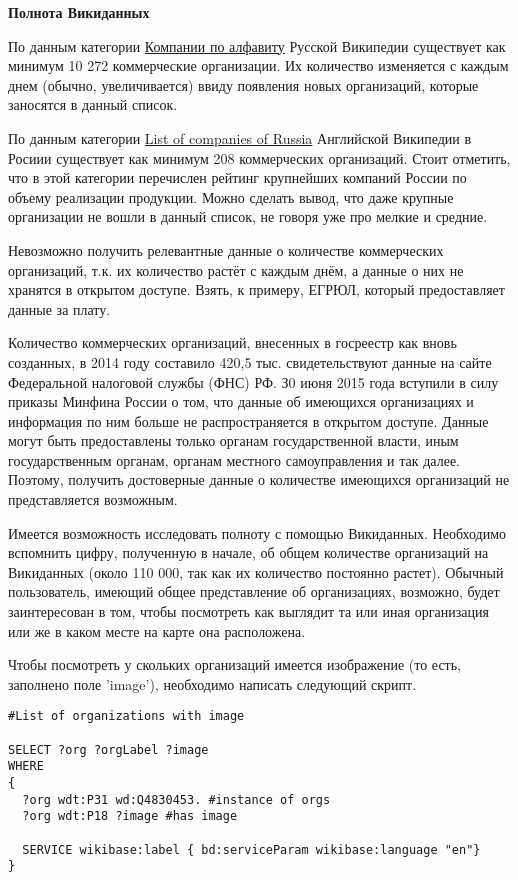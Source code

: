 \textbf{Полнота Викиданных}

По данным категории \href{https://ru.wikipedia.org/wiki/%D0%9A%D0%B0%D1%82%D0%B5%D0%B3%D0%BE%D1%80%D0%B8%D1%8F:%D0%9A%D0%BE%D0%BC%D0%BF%D0%B0%D0%BD%D0%B8%D0%B8_%D0%BF%D0%BE_%D0%B0%D0%BB%D1%84%D0%B0%D0%B2%D0%B8%D1%82%D1%83}{Компании по алфавиту} Русской Википедии существует как минимум 10 272 коммерческие организации. Их количество изменяется с каждым днем (обычно, увеличивается) ввиду появления новых организаций, которые заносятся в данный список.

По данным категории \href{https://en.wikipedia.org/wiki/List_of_companies_of_Russia}{List of companies of Russia} Английской Википедии в Росиии существует как минимум 208 коммерческих организаций. Стоит отметить, что в этой категории перечислен рейтинг крупнейших компаний России по объему реализации продукции. Можно сделать вывод, что даже крупные организации не вошли в данный список, не говоря уже про мелкие и средние.

Невозможно получить релевантные данные о количестве коммерческих организаций, т.к. их количество растёт с каждым днём, а данные о них не хранятся в открытом доступе. Взять, к примеру, ЕГРЮЛ, который предоставляет данные за плату.

Количество коммерческих организаций, внесенных в госреестр как вновь созданных, в 2014 году составило 420,5 тыс. свидетельствуют данные на сайте Федеральной налоговой службы (ФНС) РФ. З0 июня 2015 года вступили в силу приказы Минфина России о том, что данные об имеющихся организациях и информация по ним больше не распространяется в открытом доступе. Данные могут быть предоставлены только органам государственной власти, иным государственным органам, органам местного самоуправления и так далее. Поэтому, получить достоверные данные о количестве имеющихся организаций не представляется возможным.

Имеется возможность исследовать полноту с помощью Викиданных. Необходимо вспомнить цифру, полученную в начале, об общем количестве организаций на Викиданных (около 110 000, так как их количество постоянно растет). Обычный пользователь, имеющий общее представление об организациях, возможно, будет заинтересован в том, чтобы посмотреть как выглядит та или иная организация или же в каком месте на карте она расположена.

Чтобы посмотреть у скольких организаций имеется изображение (то есть, заполнено поле 'image'), необходимо написать следующий скрипт.

\begin{lstlisting}[language=SPARQL]
#List of organizations with image

SELECT ?org ?orgLabel ?image
WHERE
{
  ?org wdt:P31 wd:Q4830453. #instance of orgs
  ?org wdt:P18 ?image #has image
  
  SERVICE wikibase:label { bd:serviceParam wikibase:language "en"}
}
\end{lstlisting}

